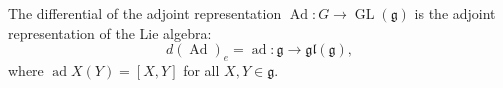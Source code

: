 The differential of the adjoint representation $\operatorname{Ad}: G \to \operatorname{GL}(\mathfrak{g})$ is the adjoint representation of the Lie algebra:
$$d(\operatorname{Ad})_e = \operatorname{ad}: \mathfrak{g} \to \mathfrak{gl}(\mathfrak{g}),$$
where $\operatorname{ad} X (Y) = [X, Y]$ for all $X, Y \in \mathfrak{g}$.

